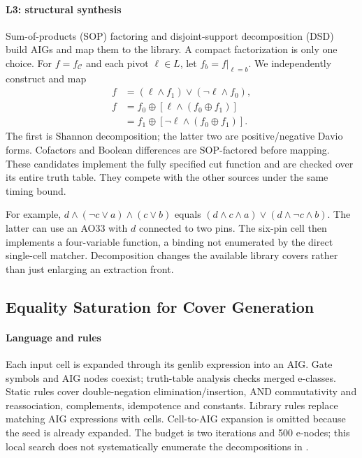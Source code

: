 \paragraph{L3: structural synthesis}
Sum-of-products (SOP) factoring and disjoint-support decomposition (DSD) build AIGs and map them to the library. A compact factorization is only one choice. For $f=f_{\mathcal C}$ and each pivot $\ell\in L$, let $f_b=f|_{\ell=b}$. We independently construct and map
\begin{align}
 f&=(\ell\wedge f_1)\vee(\neg\ell\wedge f_0),\nonumber\\
 f&=f_0\oplus[\ell\wedge(f_0\oplus f_1)]\nonumber\\
  &=f_1\oplus[\neg\ell\wedge(f_0\oplus f_1)].\label{eq:decomp}
\end{align}
The first is Shannon decomposition; the latter two are positive/negative Davio forms. Cofactors and Boolean differences are SOP-factored before mapping. These candidates implement the fully specified cut function and are checked over its entire truth table. They compete with the other sources under the same timing bound.

For example, $d\wedge(\neg c\vee a)\wedge(c\vee b)$ equals $(d\wedge c\wedge a)\vee(d\wedge\neg c\wedge b)$. The latter can use an AO33 with $d$ connected to two pins. The six-pin cell then implements a four-variable function, a binding not enumerated by the direct single-cell matcher. Decomposition changes the available library covers rather than just enlarging an extraction front.

\subsection{Equality Saturation for Cover Generation}\label{sec:egg}
\paragraph{Language and rules}
Each input cell is expanded through its genlib expression into an AIG. Gate symbols and AIG nodes coexist; truth-table analysis checks merged e-classes. Static rules cover double-negation elimination/insertion, AND commutativity and reassociation, complements, idempotence and constants. Library rules replace matching AIG expressions with cells. Cell-to-AIG expansion is omitted because the seed is already expanded. The budget is two iterations and 500 e-nodes; this local search does not systematically enumerate the decompositions in .

